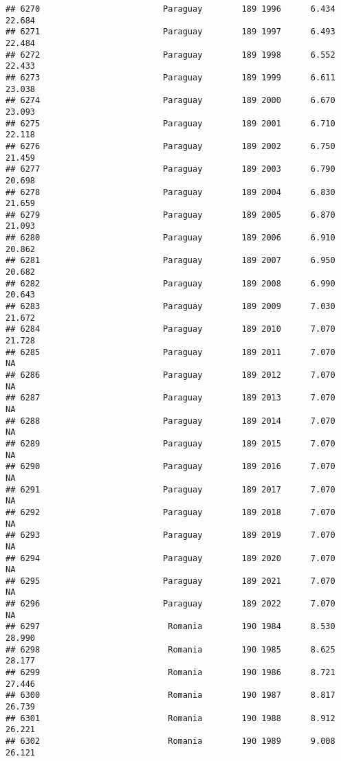 \documentclass[
]{article}
\begin{document}
\begin{verbatim}
## 6270                         Paraguay        189 1996      6.434     22.684
## 6271                         Paraguay        189 1997      6.493     22.484
## 6272                         Paraguay        189 1998      6.552     22.433
## 6273                         Paraguay        189 1999      6.611     23.038
## 6274                         Paraguay        189 2000      6.670     23.093
## 6275                         Paraguay        189 2001      6.710     22.118
## 6276                         Paraguay        189 2002      6.750     21.459
## 6277                         Paraguay        189 2003      6.790     20.698
## 6278                         Paraguay        189 2004      6.830     21.659
## 6279                         Paraguay        189 2005      6.870     21.093
## 6280                         Paraguay        189 2006      6.910     20.862
## 6281                         Paraguay        189 2007      6.950     20.682
## 6282                         Paraguay        189 2008      6.990     20.643
## 6283                         Paraguay        189 2009      7.030     21.672
## 6284                         Paraguay        189 2010      7.070     21.728
## 6285                         Paraguay        189 2011      7.070         NA
## 6286                         Paraguay        189 2012      7.070         NA
## 6287                         Paraguay        189 2013      7.070         NA
## 6288                         Paraguay        189 2014      7.070         NA
## 6289                         Paraguay        189 2015      7.070         NA
## 6290                         Paraguay        189 2016      7.070         NA
## 6291                         Paraguay        189 2017      7.070         NA
## 6292                         Paraguay        189 2018      7.070         NA
## 6293                         Paraguay        189 2019      7.070         NA
## 6294                         Paraguay        189 2020      7.070         NA
## 6295                         Paraguay        189 2021      7.070         NA
## 6296                         Paraguay        189 2022      7.070         NA
## 6297                          Romania        190 1984      8.530     28.990
## 6298                          Romania        190 1985      8.625     28.177
## 6299                          Romania        190 1986      8.721     27.446
## 6300                          Romania        190 1987      8.817     26.739
## 6301                          Romania        190 1988      8.912     26.221
## 6302                          Romania        190 1989      9.008     26.121

\end{verbatim}
\end{document}
